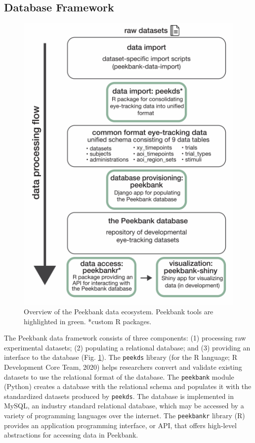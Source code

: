\documentclass[10pt, letterpaper]{article}
\newenvironment{CodeChunk}{}{}
\begin{document}
\hypertarget{database-framework}{%
\subsection{Database Framework}\label{database-framework}}

\begin{CodeChunk}
\begin{figure}[tb]

{\centering \includegraphics{figs/fig_framework_overview-1} 

}

\caption[Overview of the Peekbank data ecosystem]{Overview of the Peekbank data ecosystem. Peekbank tools are highlighted in green. *custom R packages.}\label{fig:fig_framework_overview}
\end{figure}
\end{CodeChunk}

The Peekbank data framework consists of three components: (1) processing
raw experimental datasets; (2) populating a relational database; and (3)
providing an interface to the database (Fig.
\ref{fig:fig_framework_overview}). The \texttt{peekds} library (for the
R language; R Development Core Team, 2020) helps researchers convert and
validate existing datasets to use the relational format of the database.
The \texttt{peekbank} module (Python) creates a database with the
relational schema and populates it with the standardized datasets
produced by \texttt{peekds}. The database is implemented in MySQL, an
industry standard relational database, which may be accessed by a
variety of programming languages over the internet. The
\texttt{peekbankr} library (R) provides an application programming
interface, or API, that offers high-level abstractions for accessing
data in Peekbank.
\end{document}
